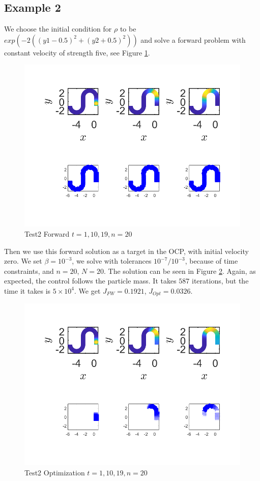 \documentclass[11pt, a4paper]{article}
\theoremstyle{definition}
\begin{document}
    \subsection{Example 2}
    We choose the initial condition for $\rho$ to be $exp(-2((y1 - 0.5 )^2 + (y2 + 0.5)^2))$ and solve a forward problem with constant velocity of strength five, see Figure \ref{FTest2FW}.
    \begin{figure}[h]
    	\centering
    	\includegraphics[scale=0.7]{Test11FW.png}
    	\caption{Test2 Forward $t =1, 10, 19, n = 20$} 
    	\label{FTest2FW}
    \end{figure}
    Then we use this forward solution as a target in the OCP, with initial velocity zero. We set $\beta = 10^{-3}$, we solve with tolerances $10^{-7}/ 10^{-3}$, because of time constraints, and $n = 20$, $N = 20$. The solution can be seen in Figure \ref{FTest2Opt}. Again, as expected, the control follows the particle mass. It takes $ 587$ iterations, but the time it takes is $ 5 \times 10^4$. We get $J_{FW} =  0.1921$, $J_{Opt} =  0.0326$. 
    \begin{figure}[h]
    	\centering
    	\includegraphics[scale=0.7]{Test11Opt.png}
    	\caption{Test2 Optimization $t =1, 10, 19, n = 20$} 
    	\label{FTest2Opt}
    \end{figure}
    
\end{document}
